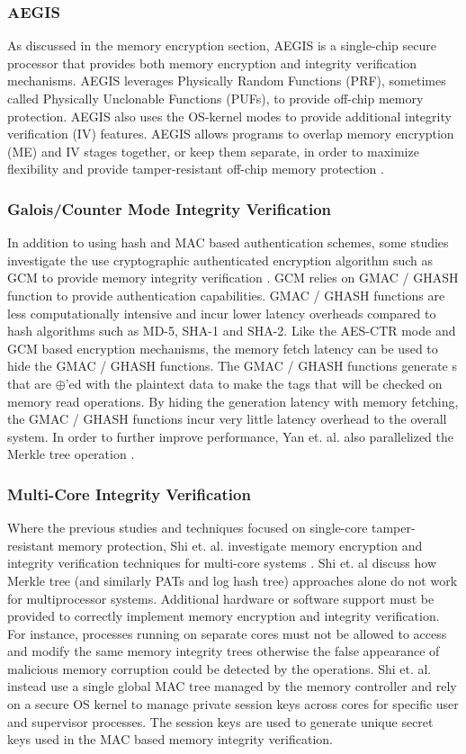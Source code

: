 \subsubsection{AEGIS}
As discussed in the memory encryption section, AEGIS is a single-chip secure
processor that provides both memory encryption and integrity verification
mechanisms. AEGIS leverages Physically Random Functions (PRF), sometimes called
Physically Unclonable Functions (PUFs), to provide off-chip memory protection.
AEGIS also uses the OS-kernel modes to provide additional integrity
verification (IV) features. AEGIS allows programs to overlap memory encryption
(ME) and IV stages together, or keep them separate, in order to maximize
flexibility and provide tamper-resistant off-chip memory protection
\cite{suh-memIntEnc}.

\subsubsection{Galois/Counter Mode Integrity Verification}
In addition to using hash and MAC based authentication schemes, some studies
investigate the use cryptographic authenticated encryption algorithm such as
GCM to provide memory integrity verification \cite{gcmMem}. GCM relies on GMAC
/ GHASH function to provide authentication capabilities. GMAC / GHASH functions
are less computationally intensive and incur lower latency overheads compared
to hash algorithms such as MD-5, SHA-1 and SHA-2. Like the AES-CTR mode and GCM
based encryption mechanisms, the memory fetch latency can be used to hide the
GMAC / GHASH functions. The GMAC / GHASH functions generate s that are
$\oplus$'ed with the plaintext data to make the tags that will be checked on
memory read operations. By hiding the  generation latency with memory
fetching, the GMAC / GHASH functions incur very little latency overhead to the
overall system. In order to further improve performance, Yan et. al. also
parallelized the Merkle tree  operation \cite{gcmMem}.

\subsubsection{Multi-Core Integrity Verification}
Where the previous studies and techniques focused on single-core
tamper-resistant memory protection, Shi et. al. investigate memory encryption
and integrity verification techniques for multi-core systems
\cite{multicoreEnc}. Shi et. al discuss how Merkle tree (and similarly PATs and
log hash tree) approaches alone do not work for multiprocessor systems.
Additional hardware or software support must be provided to correctly implement
memory encryption and integrity verification. For instance, processes running
on separate cores must not be allowed to access and modify the same memory
integrity trees otherwise the false appearance of malicious memory corruption
could be detected by the  operations. Shi et. al. instead
use a single global MAC tree managed by the memory controller and rely on a
secure OS kernel to manage private session keys across cores for specific
user and supervisor processes. The session keys are used to generate unique
secret keys used in the MAC based memory integrity verification.
